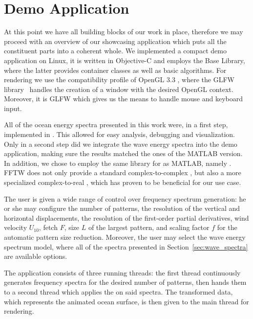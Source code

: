\section{Demo Application}
\label{sec:demo_application}
At this point we have all building blocks of our work in place, therefore we
may proceed with an overview of our showcasing application which puts
all the constituent parts into a coherent whole. We implemented a compact demo
application on Linux, it is written in Objective-C and employs the
\citet{misc:gnustep} Base Library, where the latter provides container classes
as well as basic algorithms.
For rendering we use the compatibility profile of OpenGL 3.3 \citep{misc:opengl,misc:opengl33},
where the GLFW library~\citep{misc:glfw}
handles the creation of a window with the desired OpenGL context. Moreover,
it is GLFW which gives us the means to handle mouse and keyboard input.

All of the ocean energy spectra presented in this work were, in a first step,
implemented in \citet{misc:matlab}. This allowed for easy analysis,
debugging and visualization. Only in a second step did we integrate the wave
energy spectra into the demo application, making sure the results matched the
ones of the MATLAB version. In addition, we chose to employ the same library for
\FastFourierTransforms as MATLAB, namely \citet{misc:fftw}. FFTW does
not only provide a standard complex-to-complex \DFT, but also a more specialized
complex-to-real \DFT, which has proven to be beneficial for our use case.

The user is given a wide range of control over frequency spectrum generation:
he or she may configure the number of patterns, the resolution of the vertical
and horizontal displacements, the resolution of the first-order partial
derivatives, wind velocity $U_{10}$, fetch $F$, size $L$ of the largest pattern,
and scaling factor $f$ for the automatic pattern size reduction.
Moreover, the user may select the wave energy spectrum model, where all
of the spectra presented in Section~\ref{sec:wave_spectra} are available
options.

The application consists of three running threads: the first thread continuously
generates frequency spectra for the desired number of patterns, then hands them
to a second thread which applies the \IDFT on said spectra. The transformed
data, which represents the animated ocean surface, is then given to the main
thread for rendering.
%
